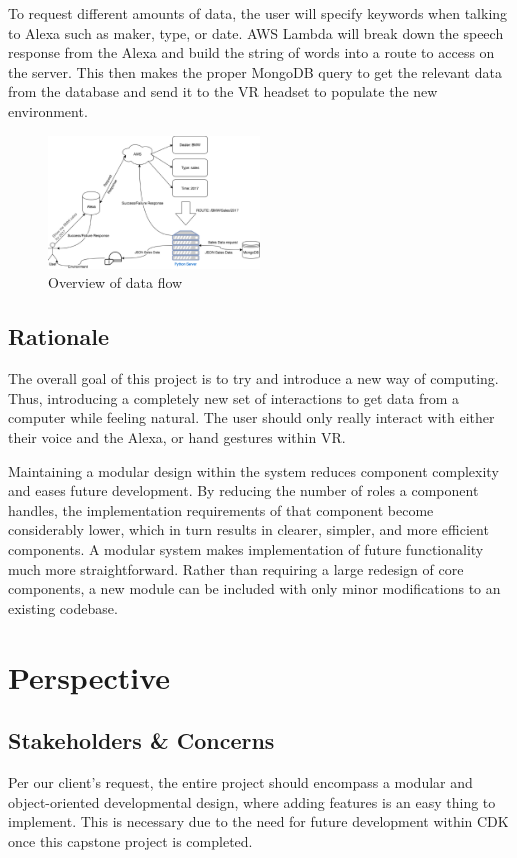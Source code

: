 \documentclass[onecolumn, draftclsnofoot,10pt, compsoc]{IEEEtran}
\begin{document}
        To request different amounts of data, the user will specify keywords when talking to Alexa such as maker, type, or date. AWS Lambda will break down the speech response from the Alexa and build the string of words into a route to access on the server. This then makes the proper MongoDB query to get the relevant data from the database and send it to the VR headset to populate the new environment.
        
        \begin{figure}
            \centering
            \includegraphics[width=0.5\textwidth]{Alexa_requests.eps}
            \caption{Overview of data flow}
            \label{fig:alexa requests}
        \end{figure}
        
    \subsection{Rationale}
        The overall goal of this project is to try and introduce a new way of computing. Thus, introducing a completely new set of interactions to get data from a computer while feeling natural. The user should only really interact with either their voice and the Alexa, or hand gestures within VR. 
        
        Maintaining a modular design within the system reduces component complexity and eases future development. By reducing the number of roles a component handles, the implementation requirements of that component become considerably lower, which in turn results in clearer, simpler, and more efficient components. A modular system makes implementation of future functionality much more straightforward. Rather than requiring a large redesign of core components, a new module can be included with only minor modifications to an existing codebase.


\section{Perspective}
    \subsection{Stakeholders \& Concerns}
        Per our client{'}s request, the entire project should encompass a modular and object-oriented developmental design, where adding features is an easy thing to implement. This is necessary due to the need for future development within CDK once this capstone project is completed.
        
\end{document}
